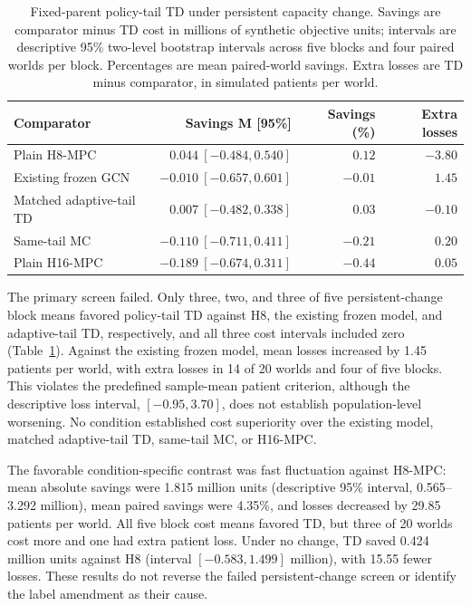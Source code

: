 \documentclass[preprint,review,12pt]{elsarticle}
\begin{document}
\begin{table}[H]
\centering
\caption{Fixed-parent policy-tail TD under persistent capacity change. Savings
are comparator minus TD cost in millions of synthetic objective units; intervals
are descriptive 95\% two-level bootstrap intervals across five blocks and four
paired worlds per block. Percentages are mean paired-world savings. Extra losses
are TD minus comparator, in simulated patients per world.}
\label{tab:policy-tail-persistent}
\begin{tabularx}{\textwidth}{Xrrr}
\toprule
Comparator & Savings M [95\%] & Savings (\%) & Extra losses \\
\midrule
Plain H8-MPC & $0.044\ [-0.484,0.540]$ & $0.12$ & $-3.80$ \\
Existing frozen GCN & $-0.010\ [-0.657,0.601]$ & $-0.01$ & $1.45$ \\
Matched adaptive-tail TD & $0.007\ [-0.482,0.338]$ & $0.03$ & $-0.10$ \\
Same-tail MC & $-0.110\ [-0.711,0.411]$ & $-0.21$ & $0.20$ \\
Plain H16-MPC & $-0.189\ [-0.674,0.311]$ & $-0.44$ & $0.05$ \\
\bottomrule
\end{tabularx}
\end{table}

The primary screen failed. Only three, two, and three of five persistent-change
block means favored policy-tail TD against H8, the existing frozen model, and
adaptive-tail TD, respectively, and all three cost intervals included zero
(Table~\ref{tab:policy-tail-persistent}). Against the existing frozen model,
mean losses increased by 1.45 patients per world, with extra losses in 14 of 20
worlds and four of five blocks. This violates the predefined sample-mean patient
criterion, although the descriptive loss interval, $[-0.95,3.70]$, does not
establish population-level worsening. No condition established cost superiority
over the existing model, matched adaptive-tail TD, same-tail MC, or H16-MPC.

The favorable condition-specific contrast was fast fluctuation against H8-MPC:
mean absolute savings were 1.815 million units (descriptive 95\% interval,
0.565--3.292 million), mean paired savings were 4.35\%, and losses decreased by
29.85 patients per world. All five block cost means favored TD, but three of 20
worlds cost more and one had extra patient loss. Under no change, TD saved
0.424 million units against H8 (interval $[-0.583,1.499]$ million), with 15.55
fewer losses. These results do not reverse the failed persistent-change screen
or identify the label amendment as their cause.
\end{document}
